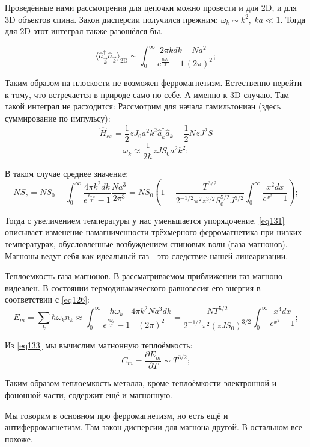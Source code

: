 \documentclass[a4paper, 14pt, russian]{article}
\newcommand{\be}{\begin{equation}}
\newcommand{\ee}{\end{equation}}
\newcommand{\pa}{\partial}
\begin{document}
	Проведённые нами рассмотрения для цепочки можно провести и для
	2D, и для 3D объектов спина. Закон дисперсии получился прежним:
	$\omega_k \sim k^2,~ ka \ll 1$. Тогда для 2D этот 
	интеграл также разошёлся бы.

	\be
		\langle \hat{a}_{\vec k}^\dagger \hat{a}_{\vec k} \rangle_{\text{2D}} \sim
			\int_0^\infty \frac{2 \pi k dk}{e^{\frac{\hbar\omega_k}{T}} - 1}
			\frac{Na^2}{(2\pi)^2}; 
	\ee

	Таким образом на плоскости не возможен ферромагнетизм.
	Естественно перейти к тому, что встречается в природе само по себе.
	А именно к 3D случаю. Там такой интеграл не расходится:
	Рассмотрим для начала гамильтониан (здесь суммирование
	по импульсу):
	\be
		\label{eq130}
		\hat{H}_{ex} = \frac{1}{2} z J_0 a^2 k^2 \hat{a}_k^\dagger \hat{a}_k
			- \frac{1}{2} Nz J^2 S
	\ee
	\be
		\omega_k \approx \frac{1}{2\hbar} z J S_0 a^2 k^2;
	\ee
	
	В таком случае среднее значение:
	\be
		\label{eq131}
		NS_z = NS_0 - \int_0^\infty \frac{4\pi k^2 dk}
			{e^{\frac{\hbar \omega_k}{T}} - 1} \frac{Na^3}{2\pi^3}
			= NS_0 \left(1 - \frac{T^{3/2}}{2^{-1/2} \pi^2 z^{3/2} S_0^{5/2} J^{3/2}}
			\int_0^\infty \frac{x^2 dx}{e^{x^2} - 1} \right);
	\ee

	Тогда с увеличением температуры у нас уменьшается упорядочение.
	\ref{eq131} описывает изменение намагниченности трёхмерного
	ферромагнетика при низких температурах, обусловленные 
	возбуждением спиновых волн (газа магнонов). Магноны ведут 
	себя как идеальный газ - это следствие нашей линеаризации.

	Теплоемкость газа магнонов. В рассматриваемом приближении
	газ магноно видеален. В состоянии термодинамического
	равновесия его энергия в соответствии с \ref{eq126}:
	\be
		\label{eq133}
		E_m = \sum_k \hbar \omega_k n_k \approx
			\int_0^\infty \frac{\hbar\omega_k}{e^\frac{\hbar\omega_k}{T} - 1} 
			\frac{4\pi k^2 N a^3 dk}{(2\pi)^2} = 
			\frac{NT^{5/2}}{2^{-1/2} \pi^2 (zJS_0)^{3/2}}
			\int_0^\infty \frac{x^4 dx}{e^{x^2} - 1};
	\ee

	Из \ref{eq133}  мы вычислим магнонную теплоёмкость:
	\be
		C_m = \frac{\pa E_m}{\pa T} \sim T^{3/2};
	\ee

	Таким образом теплоемкость металла, кроме теплоёмкости
	электронной и фононной части, содержит ещё и магнонную.

	Мы говорим в основном про ферромагнетизм, но есть ещё 
	и антиферромагнетизм. Там закон дисперсии для магнона 
	другой. В остальном все похоже. 
\end{document}
